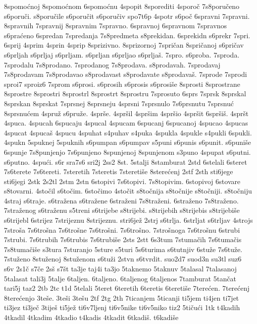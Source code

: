 {8spomoćnoj
8spomoćnom
6spomoćnu
4spopit
8sporediti
4sporoč
7s8poručeno
s6poruči.
s8poručile
s6poručit
s6poručiv
spo7t6p
4spotr
s6poč
6spravni
7spravni.
8spravnih
7spravnij
8spravnim
7spravno.
6spravnoj
6spravnom
7spravnos
s6praćeno
6spredan
7spredanja
7s8predmeta
s8prekidan.
6sprekidn
s6prekr
7spri.
6sprij
4sprim
4sprin
4sprip
8sprizivno.
8sprizornoj
7spričan
8spričanoj
s6pričav
s6prljah
s6prljaj
s6prljam.
s6prljan
s6prljao
s6prljaš.
7spro.
s6proba.
7sproda.
7sprodalu
7s8prodano.
7sprodanog
7s8prodava.
s8prodavah.
7sprodavaj
7s8prodavam
7s8prodavao
s8prodavast
s8prodavate
s8prodavaš.
7sprode
7sprodi
sproi7
sproiz6
7sprom
s6prosi.
s6prosih
s6prosis
s6prosiše
8sprosti
8sprostrane
8sprostre
8sprostri
8sprostrl
8sprostrt
8sprostru
7sprosuto
6sprs
7sprsk
8sprskal
8sprskan
8sprskat
7sprsnej
8sprsneju
4sprsni
7sprsnulo
7s6prsnutu
7sprsnuć
8sprsnućem
4spruž
s6pruže.
4sprše.
4spršil
4spršim
4spršio
4spršit
6spršiš.
4spršt
4spuca.
4spucah
6spucaju
4spucal
4spucam
6spucanj
6spucanoj
4spucao
4spucas
4spucat
4spucaš
4spucu
4spuhat
s4puhav
s4puka
4spukla
4spukle
s4pukli
6spukli.
4spukn
5spuknej
5spuknih
s6pumpan
s6pumpav
s5puni
s6punis
s6punit.
s6puniše
6spunje
7s8punjenjo
7s6punjeno
8spunjenoj
8spunjenom
s3puno
4spupat
s6putni.
s6putno.
4spući.
s6r
sra7s6
sri2j
2ss2
8st.
5stalji
8stamburat
2std
6stelali
6steret
7s6terete
7s6tereti.
7steretih
7steretis
7steretiše
8sterećenj
2stf
2sth
sti6jege
sti6jegi
2stk
2s2tl
2stm
2stn
6stopivi
7s6topivi.
7s8topivim.
6stopivoj
6stovare
s8tovarni.
4stočil
s6točim.
6stočimo
4stočit
s8točnija
s8točnije
s8točniji.
s8točniju
4straj
s6traje.
s6tražena
s6tražene
6straženi
7s8traženi.
6straženo
7s8traženo.
7straženog
s6traženu
s5treni
s6trijebe
s8trijebi.
s8trijebih
s8trijebis
s8trijebiše
s6trijebl
6strijez
7strijeznu
8strijeznu.
stri6jež
2strj
s6trlja.
6strljat
s6trljav
4strojs
7stroša
7s6trošna
7s6trošne
7s6trošni.
7s6trošno.
7strošnoga
7s6trošnu
6strubi
7strubi.
7s6trubih
7s6trubis
7s6trubiše
2sts
2stt
6s3tum
7stumačih
7s6tumačis
7s8tumačiše
s3tura
7sturanjo
5sture
s5turi
5s6turima
s6tutnjiv
6stuže
7s6tuže.
7stuženo
8stuženoj
8stuženom
s6tuži
2stvn
s6tvrdit.
suo2d7
suod3n
su3tl
suz6
s6v
2s1č
s7če
2sš
s7št
ta3je
taj4i
ta3jo
5taknemo
5taknuv
5talasal
7talasanoj
5talasat
tali3j
5talje
6taljen.
6taljeno.
6taljenog
6taljenos
7tamburat
5tančat
tari5j
taz2
2tb
2tc
t1d
5telali
5teret
6teretih
6teretis
6teretiše
7terećen.
7terećenj
8terećenjo
3teše.
3teši
3tešu
2tf
2tg
2th
7ticanjem
5ticanji
ti5jem
ti4jen
ti7jet
ti3jez
ti3ječ
3tiješ
ti5jež
ti6v7ljenj
ti6v5nike
ti6v5niko
tiz2
5tičući
1tk
t4kadih
4tkadil
4tkadim
4tkadio
t4kadis
4tkadit
6tkadiš.
t6kadiše
}
